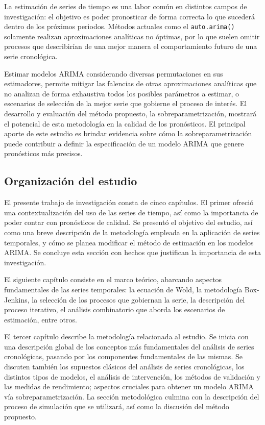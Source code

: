 \documentclass[
]{article}
\begin{document}
La estimación de series de tiempo es una labor común en distintos campos
de investigación: el objetivo es poder pronosticar de forma correcta lo
que sucederá dentro de los próximos periodos. Métodos actuales como el
\texttt{auto.arima()} solamente realizan aproximaciones analíticas no
óptimas, por lo que suelen omitir procesos que describirían de una mejor
manera el comportamiento futuro de una serie cronológica.

Estimar modelos ARIMA considerando diversas permutaciones en sus
estimadores, permite mitigar las falencias de otras aproximaciones
analíticas que no analizan de forma exhaustiva todos los posibles
parámetros a estimar, o escenarios de selección de la mejor serie que
gobierne el proceso de interés. El desarrollo y evaluación del método
propuesto, la sobreparametrización, mostrará el potencial de esta
metodología en la calidad de los pronósticos. El principal aporte de
este estudio es brindar evidencia sobre cómo la sobreparametrización
puede contribuir a definir la especificación de un modelo ARIMA que
genere pronósticos más precisos.

\subsection{Organización del estudio}

El presente trabajo de investigación consta de cinco capítulos. El
primer ofreció una contextualización del uso de las series de tiempo,
así como la importancia de poder contar con pronósticos de calidad. Se
presentó el objetivo del estudio, así como una breve descripción de la
metodología empleada en la aplicación de series temporales, y cómo se
planea modificar el método de estimación en los modelos ARIMA. Se
concluye esta sección con hechos que justifican la importancia de esta
investigación.

El siguiente capítulo consiste en el marco teórico, abarcando aspectos
fundamentales de las series temporales: la ecuación de Wold, la
metodología Box-Jenkins, la selección de los procesos que gobiernan la
serie, la descripción del proceso iterativo, el análisis combinatorio
que aborda los escenarios de estimación, entre otros.

El tercer capítulo describe la metodología relacionada al estudio. Se
inicia con una descripción global de los conceptos más fundamentales del
análisis de series cronológicas, pasando por los componentes
fundamentales de las mismas. Se discuten también los supuestos clásicos
del análisis de series cronológicas, los distintos tipos de modelos, el
análisis de intervención, los métodos de validación y las medidas de
rendimiento; aspectos cruciales para obtener un modelo ARIMA vía
sobreparametrización. La sección metodológica culmina con la descripción
del proceso de simulación que se utilizará, así como la discusión del
método propuesto.
\end{document}
